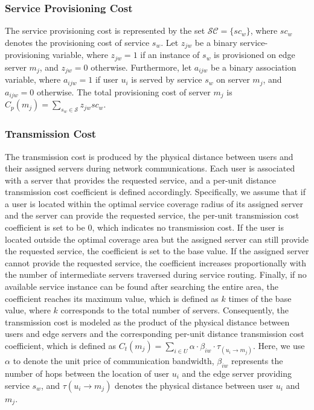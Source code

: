 \documentclass[10pt, conference, letterpaper]{IEEEtran}
\newenvironment{revision}{\begingroup\color{blue}}{\endgroup}
\newenvironment{revision}{\begingroup}{\endgroup}
\begin{document}
\subsubsection{Service Provisioning Cost} 
\begin{revision}
The service provisioning cost is represented by the set $\mathcal{SC}=\{sc_w\}$, where $sc_w$ denotes the provisioning cost of service $s_w$. Let $z_{jw}$ be a binary service-provisioning variable, where $z_{jw}=1$ if an instance of $s_w$ is provisioned on edge server $m_j$, and $z_{jw}=0$ otherwise. Furthermore, let $a_{ijw}$ be a binary association variable, where $a_{ijw}=1$ if user $u_i$ is served by service $s_w$ on server $m_j$, and $a_{ijw}=0$ otherwise. The total provisioning cost of server $m_j$ is $C_p(m_j)=\sum_{s_w\in\mathcal{S}}z_{jw}sc_w$.
\end{revision}

\subsubsection{Transmission Cost}
The transmission cost is produced by the physical distance between users and their assigned servers during network communications. Each user is associated with a server that provides the requested service, and a per-unit distance transmission cost coefficient is defined accordingly. Specifically, we assume that if a user is located within the optimal service coverage radius of its assigned server and the server can provide the requested service, the per-unit transmission cost coefficient is set to be $0$, which indicates no transmission cost. If the user is located outside the optimal coverage area but the assigned server can still provide the requested service, the coefficient is set to the base value. If the assigned server cannot provide the requested service, the coefficient increases proportionally with the number of intermediate servers traversed during service routing. Finally, if no available service instance can be found after searching the entire area, the coefficient reaches its maximum value, which is defined as $k$ times of the base value, where $k$ corresponds to the total number of servers. Consequently, the transmission cost is modeled as the product of the physical distance between users and edge servers and the corresponding per-unit distance transmission cost coefficient, which is defined as $C_{t}(m_j) = \sum_{i \in U} \alpha\cdot \beta_{iw}\cdot\tau_{(u_i \rightarrow m_j)}$. Here, we use $\alpha$ to denote the unit price of communication bandwidth, $\beta_{iw}$ represents the number of hops between the location of user $u_i$ and the edge server providing service $s_w$, and $\tau(u_i \rightarrow m_j)$ denotes the physical distance between user $u_i$ and $m_j$.
\end{document}
